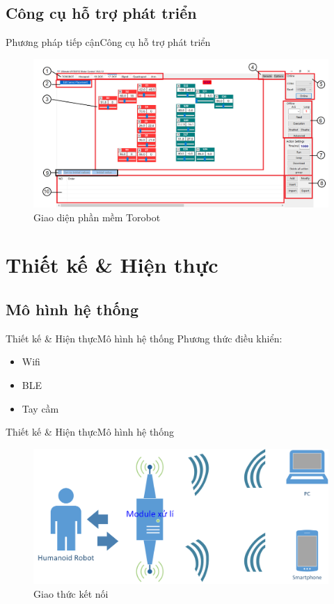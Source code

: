 \documentclass[compress, blue, 13pt,hyperref={pdfpagemode=FullScreen}]{beamer}
\begin{document}
\subsection{Công cụ hỗ trợ phát triển}
\begin{frame}{Phương pháp tiếp cận}{Công cụ hỗ trợ phát triển}
\begin{figure}[hbtp]
\centering
\includegraphics[scale=0.22]{images/Torobot.png}
\caption{Giao diện phần mềm Torobot}
\end{figure}

\end{frame}
\section{Thiết kế \& Hiện thực}
\subsection{Mô hình hệ thống}
\begin{frame}{Thiết kế \& Hiện thực}{Mô hình hệ thống}
Phương thức điều khiển:
\begin{itemize}
\item Wifi
\item BLE
\item Tay cầm
\end{itemize}
\end{frame}
\begin{frame}{Thiết kế \& Hiện thực}{Mô hình hệ thống}
\begin{figure}[hbtp]
\centering
\includegraphics[scale=0.5]{images/protocol.png}
\caption{Giao thức kết nối}
\end{figure}
\end{frame}
\end{document}
